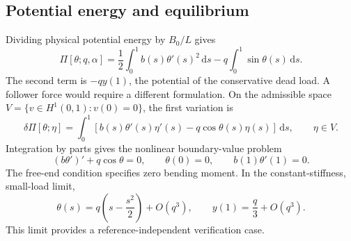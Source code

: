 \documentclass[11pt,a4paper]{article}
\newcommand{\dd}{\,\mathrm{d}}
\begin{document}
\subsection{Potential energy and equilibrium}
Dividing physical potential energy by $B_0/L$ gives
\begin{equation}
 \Pi[\theta;q,\alpha]
 =\frac12\int_0^1 b(s)\theta'(s)^2\dd s
 -q\int_0^1\sin\theta(s)\dd s.
 \label{eq:energy}
\end{equation}
The second term is $-q y(1)$, the potential of the conservative dead load. A follower force would require a different formulation. On the admissible space $V=\{v\in H^1(0,1):v(0)=0\}$, the first variation is
\begin{equation}
 \delta\Pi[\theta;\eta]
 =\int_0^1\left[b(s)\theta'(s)\eta'(s)-q\cos\theta(s)\eta(s)\right]\dd s,
 \qquad \eta\in V.
 \label{eq:variation}
\end{equation}
Integration by parts gives the nonlinear boundary-value problem
\begin{equation}
 (b\theta')'+q\cos\theta=0,\qquad
 \theta(0)=0,\qquad b(1)\theta'(1)=0.
 \label{eq:equilibrium}
\end{equation}
The free-end condition specifies zero bending moment. In the constant-stiffness, small-load limit,
\begin{equation}
 \theta(s)=q\left(s-\frac{s^2}{2}\right)+O(q^3),
 \qquad y(1)=\frac{q}{3}+O(q^3).
 \label{eq:smallload}
\end{equation}
This limit provides a reference-independent verification case.
\end{document}
